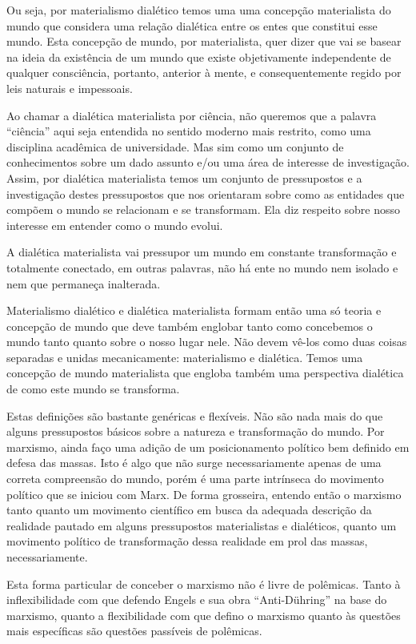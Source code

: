Ou seja, por materialismo dialético temos uma uma concepção materialista do mundo que considera uma relação dialética entre os entes que constitui esse mundo. Esta concepção de mundo, por materialista, quer dizer que vai se basear na ideia da existência de um mundo que existe objetivamente independente de qualquer consciência, portanto, anterior à mente, e consequentemente regido por leis naturais e impessoais.

Ao chamar a dialética materialista por ciência, não queremos que a palavra “ciência” aqui seja entendida no sentido moderno mais restrito, como uma disciplina acadêmica de universidade. Mas sim como um conjunto de conhecimentos sobre um dado assunto e/ou uma área de interesse de investigação. Assim, por dialética materialista temos um conjunto de pressupostos e a investigação destes pressupostos que nos orientaram sobre como as entidades que compõem o mundo se relacionam e se transformam. Ela diz respeito sobre nosso interesse em entender como o mundo evolui.

A dialética materialista vai pressupor um mundo em constante transformação e totalmente conectado, em outras palavras, não há ente no mundo nem isolado e nem que permaneça inalterada.

Materialismo dialético e dialética materialista formam então uma só teoria e concepção de mundo que deve também englobar tanto como concebemos o mundo tanto quanto sobre o nosso lugar nele. Não devem vê-los como duas coisas separadas e unidas mecanicamente: materialismo e dialética. Temos uma concepção de mundo materialista que engloba também uma perspectiva dialética de como este mundo se transforma.

Estas definições são bastante genéricas e flexíveis. Não são nada mais do que alguns pressupostos básicos sobre a natureza e transformação do mundo. Por marxismo, ainda faço uma adição de um posicionamento político bem definido em defesa das massas. Isto é algo que não surge necessariamente apenas de uma correta compreensão do mundo, porém é uma parte intrínseca do movimento político que se iniciou com Marx. De forma grosseira, entendo então o marxismo tanto quanto um movimento científico em busca da adequada descrição da realidade pautado em alguns pressupostos materialistas e dialéticos, quanto um movimento político de transformação dessa realidade em prol das massas, necessariamente.

Esta forma particular de conceber o marxismo não é livre de polêmicas. Tanto à inflexibilidade com que defendo Engels e sua obra “Anti-Dühring” na base do marxismo, quanto a flexibilidade com que defino o marxismo quanto às questões mais específicas são questões passíveis de polêmicas.

